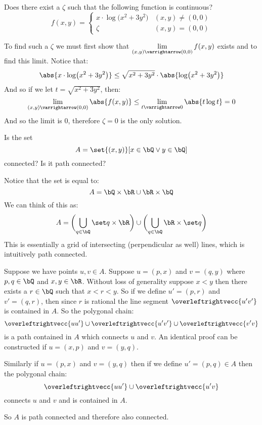 \documentclass[10pt]{article}
\let\lineseg=\overleftrightvecc
\begin{document}
\begin{exercise*}

    Does there exist a $\zeta$ such that the following function is continuous?
    \[ f(x,y) = \begin{cases} x\cdot\log\bigl(x^2 + 3y^2\bigr) & (x,y)\neq(0,0) \\
                    \zeta & (x,y)=(0,0) \end{cases} \]

\end{exercise*}

\begin{blankpp}

    To find such a $\zeta$ we must first show that $\lim\limits_{(x,y)\varrightarrow(0,0)}f(x,y)$
    exists and to find this limit.
    Notice that:
        \[ \abs{x\cdot\log\bigl(x^2+3y^2\bigr)} \leq
        \sqrt{x^2+3y^2}\cdot\abs{\log\bigl(x^2+3y^2\bigr)} \]
    And so if we let $t=\sqrt{x^2+3y^2}$, then:
        \[ \lim_{(x,y)\varrightarrow(0,0)}\abs{f(x,y)} \leq
        \lim_{t\varrightarrow0}\abs{t\log t} = 0 \]
    And so the limit is $0$, therefore $\zeta=0$ is the only solution.

\end{blankpp}

\begin{exercise*}

    Is the set
        \[ A = \set{(x,y)}[x\in\bQ\lor y\in\bQ] \]
    connected? Is it path connected?

\end{exercise*}

\begin{blankpp}

    Notice that the set is equal to:
        \[ A = \bQ\times\bR \cup \bR\times\bQ \]
    We can think of this as:
        \[ A = \biggl(\bigcup_{q\in\bQ}\set q\times\bR\biggr) \cup
        \biggl(\bigcup_{q\in\bQ}\bR\times\set q\biggr) \]
    This is essentially a grid of intersecting (perpendicular as well) lines, which is intuitively
    path connected.

    Suppose we have points $u,v\in A$.
    Suppose $u=(p,x)$ and $v=(q,y)$ where $p,q\in\bQ$ and $x,y\in\bR$.
    Without loss of generality suppose $x<y$ then there exists a $r\in\bQ$ such that $x<r<y$.
    So if we define $u'=(p,r)$ and $v'=(q,r)$, then since $r$ is rational the line segment 
    $\lineseg{u'v'}$ is contained in $A$.
    So the polygonal chain:
        \[ \lineseg{uu'}\cup\lineseg{u'v'}\cup\lineseg{v'v} \]
    is a path contained in $A$ which connects $u$ and $v$.
    An identical proof can be constructed if $u=(x,p)$ and $v=(y,q)$.

    Similarly if $u=(p,x)$ and $v=(y,q)$ then if we define $u'=(p,q)\in A$ then the polygonal chain:
        \[ \lineseg{uu'}\cup\lineseg{u'v} \]
    connects $u$ and $v$ and is contained in $A$.

    So $A$ is path connected and therefore also connected.

\end{blankpp}
\end{document}
